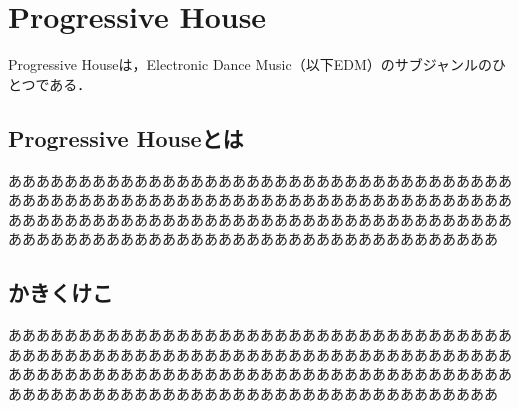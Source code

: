 \chapter{Progressive House}
Progressive Houseは，Electronic Dance Music（以下EDM）のサブジャンルのひとつである．

\section{Progressive Houseとは}
あああああああああああああああああああああああああああああああああああああああああああああああああああああああああああああああああああああああああああああああああああああああああああああああああああああああああああああああああああああああああああああああああああああああああああああああ


\section{かきくけこ}
あああああああああああああああああああああああああああああああああああああああああああああああああああああああああああああああああああああああああああああああああああああああああああああああああああああああああああああああああああああああああああああああああああああああああああああああ
